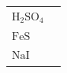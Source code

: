 \begin{enumerate}[noitemsep, label=\textbf{\arabic*}. ]
{\begin{tabular}[t]{|l|l|}
    
        \begin{math}\mathrm{H}{}_{2}\mathrm{SO}{}_{4}\end{math} &
    
    
     \tabularnewline\cline{1-1}\cline{2-2}
    
    
        \begin{math}\mathrm{FeS}\end{math} &
    
    
     \tabularnewline\cline{1-1}\cline{2-2}
    
    
        \begin{math}\mathrm{NaI}\end{math} &
    
    
     \tabularnewline\cline{1-1}\cline{2-2}
    
    

\end{tabular}}
\end{enumerate}
